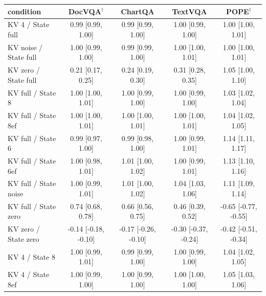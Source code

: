 \begin{tabular}{lcccc}
\toprule
condition & DocVQA$^\dagger$ & ChartQA & TextVQA & POPE$^\dagger$ \\
\midrule
KV 4 / State full & 0.99 {\scriptsize[0.99, 1.00]} & 0.99 {\scriptsize[0.99, 1.00]} & 1.00 {\scriptsize[0.99, 1.00]} & 1.00 {\scriptsize[1.00, 1.01]} \\
KV noise / State full & 1.00 {\scriptsize[0.99, 1.00]} & 0.99 {\scriptsize[0.99, 1.00]} & 1.00 {\scriptsize[1.00, 1.01]} & 1.00 {\scriptsize[1.00, 1.01]} \\
KV zero / State full & 0.21 {\scriptsize[0.17, 0.25]} & 0.24 {\scriptsize[0.19, 0.30]} & 0.31 {\scriptsize[0.28, 0.35]} & 1.05 {\scriptsize[1.00, 1.10]} \\
KV full / State 8 & 1.00 {\scriptsize[1.00, 1.01]} & 1.00 {\scriptsize[0.99, 1.00]} & 1.00 {\scriptsize[0.99, 1.00]} & 1.03 {\scriptsize[1.02, 1.04]} \\
KV full / State 8ef & 1.00 {\scriptsize[1.00, 1.01]} & 1.00 {\scriptsize[1.00, 1.01]} & 1.00 {\scriptsize[1.00, 1.01]} & 1.04 {\scriptsize[1.02, 1.05]} \\
KV full / State 6 & 0.99 {\scriptsize[0.97, 1.00]} & 0.99 {\scriptsize[0.98, 1.00]} & 1.00 {\scriptsize[0.99, 1.01]} & 1.14 {\scriptsize[1.11, 1.17]} \\
KV full / State 6ef & 1.00 {\scriptsize[0.98, 1.01]} & 1.01 {\scriptsize[1.00, 1.02]} & 1.00 {\scriptsize[0.99, 1.01]} & 1.13 {\scriptsize[1.10, 1.16]} \\
KV full / State noise & 1.00 {\scriptsize[0.99, 1.01]} & 1.01 {\scriptsize[1.00, 1.02]} & 1.04 {\scriptsize[1.03, 1.06]} & 1.11 {\scriptsize[1.09, 1.14]} \\
KV full / State zero & 0.74 {\scriptsize[0.68, 0.78]} & 0.66 {\scriptsize[0.56, 0.75]} & 0.46 {\scriptsize[0.39, 0.52]} & -0.65 {\scriptsize[-0.77, -0.55]} \\
KV zero / State zero & -0.14 {\scriptsize[-0.18, -0.10]} & -0.17 {\scriptsize[-0.26, -0.10]} & -0.30 {\scriptsize[-0.37, -0.24]} & -0.42 {\scriptsize[-0.51, -0.34]} \\
KV 4 / State 8 & 1.00 {\scriptsize[0.99, 1.01]} & 0.99 {\scriptsize[0.99, 1.00]} & 1.00 {\scriptsize[0.99, 1.00]} & 1.04 {\scriptsize[1.02, 1.05]} \\
KV 4 / State 8ef & 1.00 {\scriptsize[0.99, 1.00]} & 1.00 {\scriptsize[0.99, 1.00]} & 1.00 {\scriptsize[1.00, 1.00]} & 1.05 {\scriptsize[1.03, 1.06]} \\

\end{tabular}
